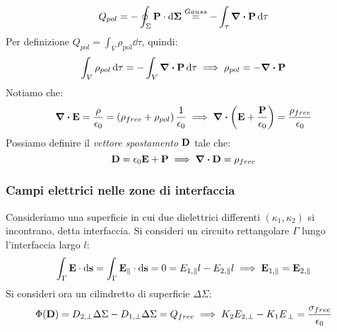 \documentclass[12pt,a4paper]{article}
\begin{document}
\begin{equation*}
    Q_{pol} = -\oint_{\Sigma} \vb{P} \cdot \dd{\vb{\Sigma}} \overset{Gauss}{=} -\int_{\tau} \div \vb{P} \dd{\tau}
\end{equation*}
Per definizione \( Q_{pol} = \int_{V} \rho_{\text{pol}} \dd{\tau} \), quindi:
\begin{equation*}
    \int_{V} \rho_{pol} \dd{\tau} = -\int_{V} \div \vb{P} \dd{\tau}
    \implies \rho_{pol} = -\div \vb{P}
\end{equation*}
Notiamo che:
\begin{equation*}
    \div\vb{E}=\frac{\rho}{\epsilon_0}= \left( \rho_{free} +\rho_{pol} \right) \frac{1}{\epsilon_0}\implies \div(\vb{E}+\frac{\vb{P}}{\epsilon_0})= \frac{\rho_{free}}{\epsilon_0}
\end{equation*}
Possiamo definire il \textit{vettore spostamento} $\vb{D}$ tale che:
\begin{equation*}
    \vb{D}= \epsilon_0\vb{E} + \vb{P} \implies \div \vb{D} = \rho_{free}
\end{equation*}

\subsubsection{Campi elettrici nelle zone di interfaccia}
Consideriamo una superficie in cui due dielettrici differenti $(\kappa_1, \kappa_2)$ si incontrano, detta interfaccia. 
Si consideri un circuito rettangolare $\Gamma$ lungo l'interfaccia largo $l$:
\begin{equation*}
    \int_\Gamma \vb{E}\cdot\dd{\vb{s}}= \int_\Gamma \vb{E}_\parallel\cdot\dd{\vb{s}}= 0 = E_{1,\parallel}l-E_{2,\parallel}l \implies \vb{E}_{1,\parallel}= \vb{E}_{2,\parallel}
\end{equation*}
Si consideri ora un cilindretto di superficie $\Delta\Sigma$:
\begin{equation*}
    \Phi(\vb{D})= D_{2,\perp}\Delta\Sigma-D_{1,\perp}\Delta\Sigma = Q_{free}\implies K_2E_{2,\perp} -K_1E_{\,\perp}= \frac{\sigma_{free}}{\epsilon_0}
\end{equation*}
\end{document}
